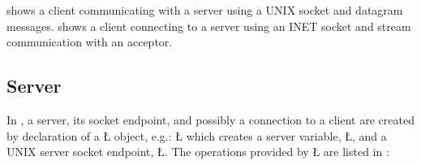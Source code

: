 \documentclass[openright,twoside]{report}
\begin{document}
 shows a client communicating with a server using a UNIX socket and datagram messages.
 shows a client connecting to a server using an INET socket and stream communication with an acceptor.


\subsection{Server}

\begin{sloppypar}
In \uC, a server, its socket endpoint, and possibly a connection to a client are created by declaration of a \LGinlinetrue\LGbegin\lgrinde\L{}\endlgrinde\LGend{} object, e.g.:
\LGinlinefalse\LGbegin\lgrinde
\L{}
\endlgrinde\LGend
which creates a server variable, \LGinlinetrue\LGbegin\lgrinde\L{}\endlgrinde\LGend{}, and a UNIX server socket endpoint, \LGinlinetrue\LGbegin\lgrinde\L{}\endlgrinde\LGend{}.
The operations provided by \LGinlinetrue\LGbegin\lgrinde\L{}\endlgrinde\LGend{} are listed in :
\end{sloppypar}
\end{document}

